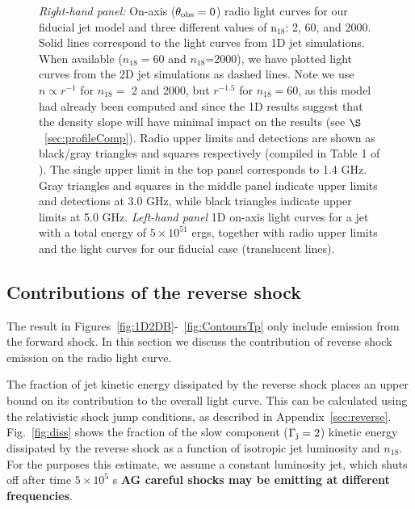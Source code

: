\documentclass[usenatbib,fleqn]{mnras}
\begin{document}
\begin{figure}
  \caption{\label{fig:lightcurves} \textit{Right-hand panel:} On-axis
    ($\theta_{\rm obs}=0$) radio light curves for our fiducial jet
    model and three different values of n$_{18}$: 2, 60, and
    2000. Solid lines correspond to the light curves from 1D jet
    simulations. When available ($n_{18}=60$ and $n_{18}$=2000), we
    have plotted light curves from the 2D jet simulations as dashed
    lines. Note we use $n\propto r^{-1}$ for $n_{18}=$ 2 and 2000, but
    $r^{-1.5}$ for $n_{18}=60$, as this model had already been
    computed and since the 1D results suggest that the density slope
    will have minimal impact on the results (see
    $\S$~\ref{sec:profileComp}).  Radio upper limits and detections
    are shown as black/gray triangles and squares respectively
    (compiled in Table 1 of \citealt{Mimica+2015}). The single upper
    limit in the top panel corresponds to 1.4 GHz. Gray triangles and
    squares in the middle panel indicate upper limits and detections
    at 3.0 GHz, while black triangles indicate upper limits at 5.0
    GHz. \textit{Left-hand panel} 1D on-axis light curves for a jet
    with a total energy of $5\times 10^{51}$ ergs, together with radio
    upper limits and the light curves for our fiducial case
    (translucent lines).}
\end{figure}

\subsection{Contributions of the reverse shock}
The result in Figures~\ref{fig:1D2DB}-~\ref{fig:ContoursTp} only
include emission from the forward shock. In this section we discuss
the contribution of reverse shock emission on the radio light curve.

The fraction of jet kinetic energy dissipated by the reverse shock
places an upper bound on its contribution to the overall light
curve. This can be calculated using the relativistic shock jump
conditions, as described in
Appendix~\ref{sec:reverse}. Fig.~\ref{fig:diss} shows the fraction of
the slow component ($\Gamma_{\rm j}=2$) kinetic energy dissipated by
the reverse shock as a function of isotropic jet luminosity and
$n_{18}$. For the purposes this estimate, we assume a constant
luminosity jet, which shuts off after time $5 \times 10^{5}$ s {\bf AG
careful shocks may be emitting at different frequencies}.
\end{document}
